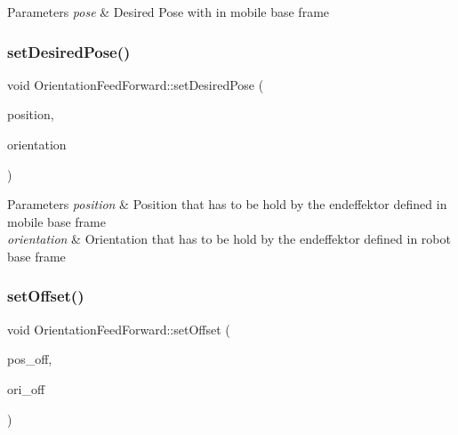 \begin{DoxyParams}{Parameters}
{\em pose} & Desired Pose with in mobile base frame \\
\hline
\end{DoxyParams}
\mbox{\label{classOrientationFeedForward_ad419aebf0df88282ca6c1dc24adbadb2}} 
\subsubsection{\texorpdfstring{set\+Desired\+Pose()}{setDesiredPose()}\hspace{0.1cm}{\footnotesize\ttfamily [2/2]}}
{\footnotesize\ttfamily void Orientation\+Feed\+Forward\+::set\+Desired\+Pose (\begin{DoxyParamCaption}\item[{Position}]{position,  }\item[{Orientation}]{orientation }\end{DoxyParamCaption})}


\begin{DoxyParams}{Parameters}
{\em position} & Position that has to be hold by the endeffektor defined in mobile base frame \\
\hline
{\em orientation} & Orientation that has to be hold by the endeffektor defined in robot base frame \\
\hline
\end{DoxyParams}
\mbox{\label{classOrientationFeedForward_adc105d9a1fe00d6a79fcf38447202709}} 
\subsubsection{\texorpdfstring{set\+Offset()}{setOffset()}\hspace{0.1cm}{\footnotesize\ttfamily [1/2]}}
{\footnotesize\ttfamily void Orientation\+Feed\+Forward\+::set\+Offset (\begin{DoxyParamCaption}\item[{Position}]{pos\+\_\+off,  }\item[{Orientation}]{ori\+\_\+off }\end{DoxyParamCaption})}


